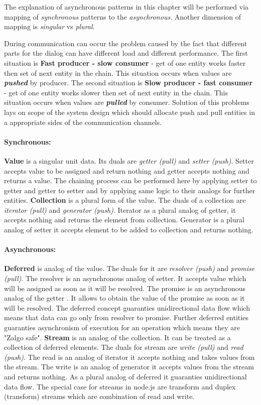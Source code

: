 The explanation of asynchronous patterns in this chapter will be performed via mapping of \textit{synchronous} patterns to the \textit{asynchronous}. Another dimension of mapping is \textit{singular} vs \textit{plural}.

During communication can occur the problem caused by the fact that different parts for the dialog can have different load and different performance. The first situation is \textbf{Fast producer - slow consumer} - get of one entity works faster then set of next entity in the chain. This situation occurs when values are \textbf{\textit{pushed}} by producer. The second situation is \textbf{Slow producer - fast consumer} - get of one entity works slower then set of next entity in the chain. This situation occurs when values are \textbf{\textit{pulled}} by consumer. Solution of  this problems lays on scope of the system design which should allocate push and pull entities in a appropriate sides of the communication channels.

\paragraph{Synchronous:} \textbf{Value} is a singular unit data. Its duals are \textit{getter (pull)} and \textit{setter (push)}. Setter accepts value to be assigned and return nothing and getter accepts nothing and returns a value. The chaining process  can be performed here by applying setter to getter and getter to setter and by applying same logic to their analogs for further  entities. \textbf{Collection} is a plural form of the value. The duals of a collection are \textit{iterator (pull)} and \textit{generator (push)}. Iterator as a plural analog of getter, it accepts nothing and returns the element from collection. Generator is a plural analog of setter it accepts element to be added to collection and returns nothing.

\paragraph{Asynchronous:} \textbf{Deferred} is analog of the value. The duals for it are \textit{resolver (push)} and \textit{promise (pull)}. The resolver is an asynchronous analog of setter. It  accepts value which will be assigned as soon as it will be resolved. The promise is an asynchronous analog of the getter . It allows to obtain the value of the promise as soon as it will be resolved. The deferred concept guaranties unidirectional data flow which means that data can go only from resolver to promise. Further deferred entities guaranties asynchronism of execution for an operation which means they are "Zalgo safe"\cite{asyncPerformance}. \textbf{Stream} is an analog of the collection. It can be treated as a collection of deferred elements. The duals for stream are \textit{write (pull)} and \textit{read (push)}. The read is an analog of iterator it accepts nothing and takes values from the stream. The write is an analog of generator it accepts values from the stream and returns nothing. As a plural analog of deferred it guaranties unidirectional data flow.  The special case for streams in node.js are transform and duplex (transform) streams which are combination of read and write.


